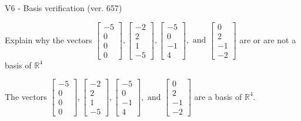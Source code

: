 \begin{exercise}
  \begin{exerciseTitle}V6 - Basis verification (ver. 657)\end{exerciseTitle}
  \begin{exerciseStatement}
    Explain why the vectors \(\left[\begin{array}{r}
-5 \\
0 \\
0 \\
0
\end{array}\right] , \left[\begin{array}{r}
-2 \\
2 \\
1 \\
-5
\end{array}\right] , \left[\begin{array}{r}
-5 \\
0 \\
-1 \\
4
\end{array}\right] , \text{ and } \left[\begin{array}{r}
0 \\
2 \\
-1 \\
-2
\end{array}\right]\) are or are not a basis of \(\mathbb{R}^4\)	


  \end{exerciseStatement}
  \begin{exerciseAnswer}
   The vectors \(\left[\begin{array}{r}
-5 \\
0 \\
0 \\
0
\end{array}\right] , \left[\begin{array}{r}
-2 \\
2 \\
1 \\
-5
\end{array}\right] , \left[\begin{array}{r}
-5 \\
0 \\
-1 \\
4
\end{array}\right] , \text{ and } \left[\begin{array}{r}
0 \\
2 \\
-1 \\
-2
\end{array}\right]\) 
  	 are  a basis of \(\mathbb{R}^4\).
  


  \end{exerciseAnswer}
\end{exercise}